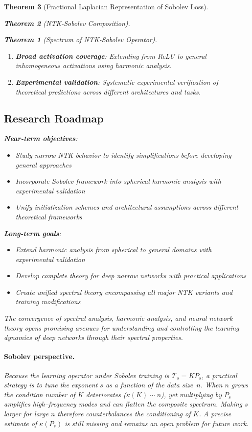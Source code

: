 \documentclass{article}
\newtheorem{theorem}{Theorem}[section]
\begin{document}
\begin{theorem}[Fractional Laplacian Representation of Sobolev Loss]
\begin{theorem}[NTK-Sobolev Composition]
\begin{theorem}[Spectrum of NTK-Sobolev Operator]
\begin{enumerate}
\item \textbf{Broad activation coverage}: Extending from ReLU to general inhomogeneous activations using harmonic analysis.

\item \textbf{Experimental validation}: Systematic experimental verification of theoretical predictions across different architectures and tasks.
\end{enumerate}

\subsection{Research Roadmap}

\textbf{Near-term objectives}:
\begin{itemize}
\item Study narrow NTK behavior to identify simplifications before developing general approaches
\item Incorporate Sobolev framework into spherical harmonic analysis with experimental validation
\item Unify initialization schemes and architectural assumptions across different theoretical frameworks
\end{itemize}

\textbf{Long-term goals}:
\begin{itemize}
\item Extend harmonic analysis from spherical to general domains with experimental validation
\item Develop complete theory for deep narrow networks with practical applications
\item Create unified spectral theory encompassing all major NTK variants and training modifications
\end{itemize}

The convergence of spectral analysis, harmonic analysis, and neural network theory opens promising avenues for understanding and controlling the learning dynamics of deep networks through their spectral properties.

\paragraph{Sobolev perspective.}  Because the learning operator under Sobolev training is $\mathcal T_s = KP_s$, a practical strategy is to tune the exponent $s$ as a function of the data size~$n$.  When $n$ grows the condition number of $K$ deteriorates ($\kappa(K)\sim n$), yet multiplying by $P_s$ amplifies high–frequency modes and can flatten the composite spectrum.  Making $s$ larger for large $n$ therefore counterbalances the conditioning of $K$.  A precise estimate of $\kappa(P_s)$ is still missing and remains an open problem for future work.


\end{theorem}
\end{theorem}
\end{theorem}
\end{document}
